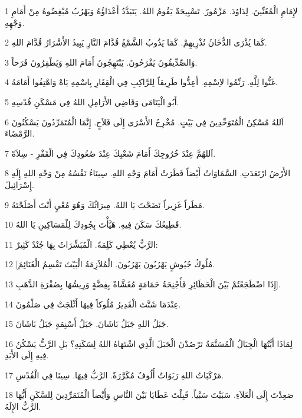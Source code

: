 \par 1 لإِمَامِ الْمُغَنِّينَ. لِدَاوُدَ. مَزْمُورٌ. تَسْبِيحَةٌ يَقُومُ اللهُ. يَتَبَدَّدُ أَعْدَاؤُهُ وَيَهْرُبُ مُبْغِضُوهُ مِنْ أَمَامِ وَجْهِهِ.
\par 2 كَمَا يُذْرَى الدُّخَانُ تُذْرِيهِمْ. كَمَا يَذُوبُ الشَّمْعُ قُدَّامَ النَّارِ يَبِيدُ الأَشْرَارُ قُدَّامَ اللهِ.
\par 3 وَالصِّدِّيقُونَ يَفْرَحُونَ. يَبْتَهِجُونَ أَمَامَ اللهِ وَيَطْفِرُونَ فَرَحاً.
\par 4 غَنُّوا لِلَّهِ. رَنِّمُوا لاِسْمِهِ. أَعِدُّوا طَرِيقاً لِلرَّاكِبِ فِي الْقِفَارِ بِاسْمِهِ يَاهْ وَاهْتِفُوا أَمَامَهُ.
\par 5 أَبُو الْيَتَامَى وَقَاضِي الأَرَامِلِ اللهُ فِي مَسْكَنِ قُدْسِهِ.
\par 6 اَللهُ مُسْكِنُ الْمُتَوَحِّدِينَ فِي بَيْتٍ. مُخْرِجُ الأَسْرَى إِلَى فَلاَحٍ. إِنَّمَا الْمُتَمَرِّدُونَ يَسْكُنُونَ الرَّمْضَاءَ.
\par 7 اَللهُمَّ عِنْدَ خُرُوجِكَ أَمَامَ شَعْبِكَ عِنْدَ صُعُودِكَ فِي الْقَفْرِ - سِلاَهْ.
\par 8 الأَرْضُ ارْتَعَدَتِ. السَّمَاوَاتُ أَيْضاً قَطَرَتْ أَمَامَ وَجْهِ اللهِ. سِينَاءُ نَفْسُهُ مِنْ وَجْهِ اللهِ إِلَهِ إِسْرَائِيلَ.
\par 9 مَطَراً غَزِيراً نَضَحْتَ يَا اللهُ. مِيرَاثُكَ وَهُوَ مُعْيٍ أَنْتَ أَصْلَحْتَهُ.
\par 10 قَطِيعُكَ سَكَنَ فِيهِ. هَيَّأْتَ بِجُودِكَ لِلْمَسَاكِينِ يَا اللهُ.
\par 11 الرَّبُّ يُعْطِي كَلِمَةً. الْمُبَشِّرَاتُ بِهَا جُنْدٌ كَثِيرٌ:
\par 12 [مُلُوكُ جُيُوشٍ يَهْرُبُونَ يَهْرُبُونَ. الْمُلاَزِمَةُ الْبَيْتَ تَقْسِمُ الْغَنَائِمَ.
\par 13 إِذَا اضْطَجَعْتُمْ بَيْنَ الْحَظَائِرِ فَأَجْنِحَةُ حَمَامَةٍ مُغَشَّاةٌ بِفِضَّةٍ وَرِيشُهَا بِصُفْرَةِ الذَّهَبِ].
\par 14 عِنْدَمَا شَتَّتَ الْقَدِيرُ مُلُوكاً فِيهَا أَثْلَجَتْ فِي صَلْمُونَ.
\par 15 جَبَلُ اللهِ جَبَلُ بَاشَانَ. جَبَلُ أَسْنِمَةٍ جَبَلُ بَاشَانَ.
\par 16 لِمَاذَا أَيَّتُهَا الْجِبَالُ الْمُسَنَّمَةُ تَرْصُدْنَ الْجَبَلَ الَّذِي اشْتَهَاهُ اللهُ لِسَكَنِهِ؟ بَلِ الرَّبُّ يَسْكُنُ فِيهِ إِلَى الأَبَدِ.
\par 17 مَرْكَبَاتُ اللهِ رَبَوَاتٌ أُلُوفٌ مُكَرَّرَةٌ. الرَّبُّ فِيهَا. سِينَا فِي الْقُدْسِ.
\par 18 صَعِدْتَ إِلَى الْعَلاَءِ. سَبَيْتَ سَبْياً. قَبِلْتَ عَطَايَا بَيْنَ النَّاسِ وَأَيْضاً الْمُتَمَرِّدِينَ لِلسَّكَنِ أَيُّهَا الرَّبُّ الإِلَهُ.

